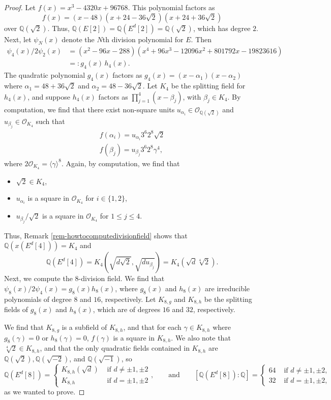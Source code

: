 \documentclass[11pt]{amsart}
\theoremstyle{definition}
\newcommand{\Q}{\mathbb Q}
\newcommand{\OO}{\mathcal{O}}
\begin{document}
\begin{proof}
    Let $f(x) = x^3 - 4320x + 96768$. This polynomial factors as 
    \[ f(x) = (x-48)(x + 24 - 36 \sqrt{2})(x + 24 + 36 \sqrt{2}) \]
    over $\Q(\sqrt{2})$. Thus, $\Q(E[2]) = \Q(E^d[2]) = \Q(\sqrt{2})$, which has degree $2$. Next, let $\psi_N(x)$ denote the $N$th division polynomial for $E$. Then 
    \begin{align*}
        \psi_4(x)/2 \psi_2(x) 
        &= (x^2 - 96x - 288)(x^4 + 96x^3 - 12096x^2 + 801792x - 19823616) \\
        &=: g_4(x) \, h_4(x).
    \end{align*}
The quadratic polynomial $g_4(x)$ factors as $g_4(x) = (x - \alpha_1)(x - \alpha_2)$ where $\alpha_1 = 48 + 36 \sqrt{2}$ and $\alpha_2 = 48 - 36 \sqrt{2}$. Let $K_4$ be the splitting field for $h_4(x)$, and suppose $h_4(x)$ factors as $\prod_{j=1}^{4} (x - \beta_j)$, with $\beta_j \in K_4$. By computation, we find that there exist non-square units $u_{\alpha_i} \in \OO_{\Q(\sqrt{2})}$ and $u_{\beta_j} \in \OO_{K_4}$ such that 
\begin{align*}
    f(\alpha_i) = u_{\alpha_i} 3^{6} 2^{8} \sqrt{2} \\
   f(\beta_j) = u_{\beta_j} 3^6 2^8 \gamma^4,
\end{align*}
where $2 \OO_{K_4} = \langle \gamma \rangle^8$.
Again, by computation, we find that
\begin{itemize}
    \item $\sqrt{2} \in K_4$,
    \item $u_{\alpha_i}$ is a square in $\OO_{K_4}$ for $i \in \{1, 2\}$,
    \item $u_{\beta_j}/\sqrt{2}$ is a square in $\OO_{K_4}$ for $1 \leq j \leq 4$.
\end{itemize}
Thus, Remark \ref{rem-howtocomputedivisionfield} shows that  $\Q(x(E^d[4])) = K_4$ and
\[ \Q(E^d[4]) = K_4 \left(\sqrt{d \sqrt{2}}, \sqrt{d u_{\beta_j}} \right) = K_4\left(\sqrt{d} \sqrt[4]{2}\right). \]
Next, we compute the $8$-division field. We find that $\psi_8(x)/2 \psi_4(x) = g_8(x) h_8(x)$, where $g_8(x)$ and $h_8(x)$ are irreducible polynomials of degree $8$ and $16$, respectively. Let $K_{8,g}$ and $K_{8,h}$ be the splitting fields of $g_8(x)$ and $h_8(x)$, which are of degrees $16$ and $32$, respectively.

We find that $K_{8,g}$ is a subfield of $K_{8,h}$, and that for each $\gamma \in K_{8,h}$ where $g_{8}(\gamma) = 0$ or $h_8(\gamma) = 0$, $f(\gamma)$ is a square in $K_{8,h}$. We also note that $\sqrt[4]{2} \in K_{8,h}$, and that the only quadratic fields contained in $K_{8, h}$ are $\Q(\sqrt{2}), \Q(\sqrt{-2})$, and $\Q(\sqrt{-1})$, so
\[ \Q(E^{d}[8]) = 
\begin{cases}
K_{8,h}(\sqrt{d}) & \text{ if } d \neq \pm 1, \pm 2 \\
K_{8,h} & \text{ if } d = \pm 1, \pm 2
\end{cases}, \qquad \text{and} \qquad [\Q(E^{d}[8]) : \Q] = 
\begin{cases}
64 & \text{ if } d \neq \pm 1, \pm 2, \\
32 & \text{ if } d = \pm 1, \pm 2,
\end{cases} \]
as we wanted to prove.
\end{proof}
\end{document}
